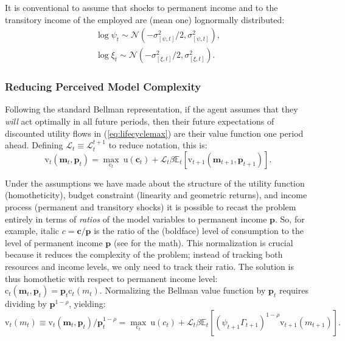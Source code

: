 \documentclass[12pt,letterpaper, fleqn]{article}
\newcommand{\CRRA}{\rho}
\newcommand{\uFunc}{\mathrm{u}}
\newcommand{\cLvl}{\mathbf{c}}
\newcommand{\mLvl}{\mathbf{m}}
\newcommand{\pLvl}{\mathbf{p}}
\newcommand{\DiscFac}{\beta}
\newcommand{\cFunc}{\mathrm{c}}
\newcommand{\vFunc}{\mathrm{v}}
\newcommand{\Alive}{\mathcal{L}}
\newcommand{\Ex}{\mathbb{E}}
\newcommand{\permGroFac}{\Gamma}
\newcommand{\permShk}{\psi}
\newcommand{\cNrm}{c}
\newcommand{\mNrm}{m}
\begin{document}
It is conventional to assume that shocks to permanent income and to the transitory income of the employed are (mean one) lognormally distributed:
\begin{align}
    \log \permShk_{t} \sim \mathcal{N}(-\sigma_{[\permShk, t]}^{2}/2,\sigma_{[\permShk, t]}^{2}),
    \\ \log \xi_{t} \sim \mathcal{N}(-\sigma_{[\xi, t]}^{2}/2,\sigma_{[\xi, t]}^{2}).
\end{align}

\subsubsection{Reducing Perceived Model Complexity}

Following the standard Bellman representation, if the agent assumes that they \textit{will} act optimally in all future periods, then their future expectations of discounted utility flows in (\ref{eq:lifecyclemax}) are their value function one period ahead. Defining $\Alive_t \equiv \Alive_t^{t+1}$ to reduce notation, this is:
\begin{equation}
\label{eq:bellman}
\pmb{\vFunc}_{t}(\mLvl_{t},\pLvl_{t}) = \max_{\pmb{\cFunc}_{t}} ~ \uFunc(\cLvl_{t}) + \Alive_t \DiscFac  \Ex_{t}\left[ \pmb{\vFunc}_{t+1}(\mLvl_{t+1},\pLvl_{t+1}) \right].
\end{equation}

Under the assumptions we have made about the structure of the utility function (homotheticity), budget constraint (linearity and geometric returns), and income process (permanent and transitory shocks) it is possible to recast the problem entirely in terms of \textit{ratios} of the model variables to permanent income $\pLvl$.
So, for example, italic $\cNrm = \cLvl/\pLvl$ is the ratio of the (boldface) level of consumption to the level of permanent income $\pLvl$ (see \cite{BufferStockTheory} for the math). This normalization is crucial because it reduces the complexity of the problem; instead of tracking both resources and income levels, we only need to track their ratio.
The solution is thus homothetic with respect to permanent income level: $\pmb{\cFunc}_t(\mLvl_t, \pLvl_t) = \pLvl_t \cFunc_t(\mNrm_t)$.
Normalizing the Bellman value function by $\pLvl_t$ requires dividing by $\pLvl^{1 -\CRRA}$, yielding:
\begin{equation}
\label{eq:normbellman}
\vFunc_{t}(\mNrm_{t}) \equiv \pmb{\vFunc}_{t}(\mLvl_{t},\pLvl_{t}) / \pLvl_t^{1-\CRRA} = \max_{\cFunc_{t}} ~ \uFunc(\cNrm_{t}) + \Alive_t \DiscFac  \Ex_{t}\left[ (\permShk_{t+1} \permGroFac_{t+1})^{1-\CRRA} \vFunc_{t+1}(\mNrm_{t+1}) \right].
\end{equation}
\end{document}
